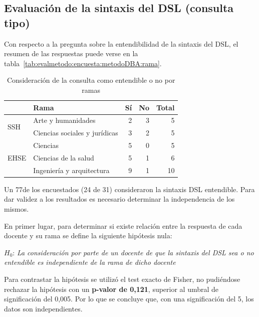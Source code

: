 \subsection{Evaluación de la sintaxis del DSL (consulta tipo)}

Con respecto a la pregunta sobre la entendibilidad de la sintaxis del DSL, el resumen de las respuestas puede verse en la tabla~\ref{tab:evalmetodo:encuesta:metodoDBA:rama}.

\begin{table}[H]
  \begin{center}
  \begin{tabular}{| l | l | r | r | r |}
    \hline
    & Rama & Sí & No & Total \\
    \hline
    \hline
    \multirow{2}{2.5cm}{SSH} & Arte y humanidades & 2 & 3 & 5  \\
    \cline{2-5}
    & Ciencias sociales y jurídicas & 3 & 2 & 5  \\
    \hline
    \multirow{3}{2.5cm}{EHSE} & Ciencias & 5 & 0 & 5  \\
    \cline{2-5}
    & Ciencias de la salud & 5 & 1 & 6  \\
    \cline{2-5}
    & Ingeniería y arquitectura & 9 & 1 & 10 \\
    \hline
  \end{tabular}
\end{center}
\caption{Consideración de la consulta como entendible o no por ramas}
\label{tab:evalmetodo:encuesta:consulta:rama}
\end{table}

Un 77\percentage{ }de los encuestados (24 de 31) consideraron la sintaxis DSL entendible. Para dar validez a los resultados es necesario determinar la independencia de los mismos.

En primer lugar, para determinar si existe relación entre la respuesta de cada docente y su rama se define la siguiente hipótesis nula:

\medskip
\begin{mdframed}[style=hipotesis0]
$H_0$: \emph{La consideración por parte de un docente de que la sintaxis del DSL sea o no entendible es independiente de la rama de dicho docente}
\end{mdframed}

\medskip
Para contrastar la hipótesis se utilizó el test exacto de Fisher, no pudiéndose rechazar la hipótesis con un \textbf{p-valor de 0,121}, superior al umbral de significación del 0,005. Por lo que se concluye que, con una significación del 5\percentage, los datos son independientes.

